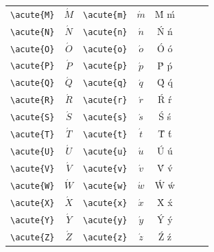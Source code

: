 \documentclass[12pt,a4paper]{article}
\begin{document}
\begin{longtable}{|l|c|l|c|c|l|c|c|}
\verb|\acute{M}|   & $\acute{M}$     & \verb|\acute{m}|   & $\acute{m}$     & Ḿ ḿ            &                  &                 & \\
\verb|\acute{N}|   & $\acute{N}$     & \verb|\acute{n}|   & $\acute{n}$     & Ń ń            &                  &                 & \\
\verb|\acute{O}|   & $\acute{O}$     & \verb|\acute{o}|   & $\acute{o}$     & Ó ó            &                  &                 & \\
\verb|\acute{P}|   & $\acute{P}$     & \verb|\acute{p}|   & $\acute{p}$     & Ṕ ṕ            &                  &                 & \\
\verb|\acute{Q}|   & $\acute{Q}$     & \verb|\acute{q}|   & $\acute{q}$     & Q́ q́            &                  &                 & \\
\verb|\acute{R}|   & $\acute{R}$     & \verb|\acute{r}|   & $\acute{r}$     & Ŕ ŕ            &                  &                 & \\
\verb|\acute{S}|   & $\acute{S}$     & \verb|\acute{s}|   & $\acute{s}$     & Ś ś            &                  &                 & \\
\verb|\acute{T}|   & $\acute{T}$     & \verb|\acute{t}|   & $\acute{t}$     & T́ t́            &                  &                 & \\
\verb|\acute{U}|   & $\acute{U}$     & \verb|\acute{u}|   & $\acute{u}$     & Ú ú            &                  &                 & \\
\verb|\acute{V}|   & $\acute{V}$     & \verb|\acute{v}|   & $\acute{v}$     & V́ v́            &                  &                 & \\
\verb|\acute{W}|   & $\acute{W}$     & \verb|\acute{w}|   & $\acute{w}$     & Ẃ ẃ            &                  &                 & \\
\verb|\acute{X}|   & $\acute{X}$     & \verb|\acute{x}|   & $\acute{x}$     & X́ x́            &                  &                 & \\
\verb|\acute{Y}|   & $\acute{Y}$     & \verb|\acute{y}|   & $\acute{y}$     & Ý ý            &                  &                 & \\
\verb|\acute{Z}|   & $\acute{Z}$     & \verb|\acute{z}|   & $\acute{z}$     & Ź ź            &                  &                 & \\
\hline
\end{longtable}

\newpage
\end{document}
